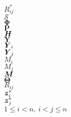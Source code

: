 \documentclass[10pt]{article}
\begin{document}
\def\bm#1{\mathpalette\bmstyle{#1}}
\def\bmstyle#1#2{\mbox{\boldmath$#1#2$}}
\newcommand{\thh}{^\mathrm{th}}


\newcommand{\PHS}{\mathrm{PHS}}
\newcommand{\MHS}{\mathrm{MHS}}
\newcommand{\HS}{\mathrm{HS}}
\newcommand{\FS}{\mathrm{FS}}
\newcommand{\Un}{\mathrm{Un}}
\newcommand{\bT}{\mathbf{\Theta}}


$R_{ij}^*$ \\

$\mathcal{S}$\\

$\mathbf{\Phi}$ \\

$\mathbf{P}$ \\

$\bm{H}$ \\
 
$\mathbf{Y}$ \\

$\bm{Y}_i$  \\

$\bm{Y}_j$ \\

$M_i$ \\

$M_j$ \\

$\bm{M}$ \\

$\bT$ \\

$R_{ij}$ \\

$\bm{z}_i^*$ \\

$\bm{z}_j^*$ \\

$1 \leq i < n,~i<j\leq n$
\end{document}
